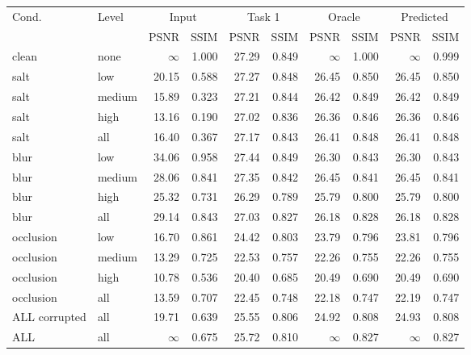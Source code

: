 \begin{tabular}{llrrrrrrrr}
\hline
Cond. & Level & \multicolumn{2}{c}{Input} & \multicolumn{2}{c}{Task 1} & \multicolumn{2}{c}{Oracle} & \multicolumn{2}{c}{Predicted} \\
 & & PSNR & SSIM & PSNR & SSIM & PSNR & SSIM & PSNR & SSIM \\
\hline
clean & none & $\infty$ & 1.000 & 27.29 & 0.849 & $\infty$ & 1.000 & $\infty$ & 0.999 \\
salt & low & 20.15 & 0.588 & 27.27 & 0.848 & 26.45 & 0.850 & 26.45 & 0.850 \\
salt & medium & 15.89 & 0.323 & 27.21 & 0.844 & 26.42 & 0.849 & 26.42 & 0.849 \\
salt & high & 13.16 & 0.190 & 27.02 & 0.836 & 26.36 & 0.846 & 26.36 & 0.846 \\
salt & all & 16.40 & 0.367 & 27.17 & 0.843 & 26.41 & 0.848 & 26.41 & 0.848 \\
blur & low & 34.06 & 0.958 & 27.44 & 0.849 & 26.30 & 0.843 & 26.30 & 0.843 \\
blur & medium & 28.06 & 0.841 & 27.35 & 0.842 & 26.45 & 0.841 & 26.45 & 0.841 \\
blur & high & 25.32 & 0.731 & 26.29 & 0.789 & 25.79 & 0.800 & 25.79 & 0.800 \\
blur & all & 29.14 & 0.843 & 27.03 & 0.827 & 26.18 & 0.828 & 26.18 & 0.828 \\
occlusion & low & 16.70 & 0.861 & 24.42 & 0.803 & 23.79 & 0.796 & 23.81 & 0.796 \\
occlusion & medium & 13.29 & 0.725 & 22.53 & 0.757 & 22.26 & 0.755 & 22.26 & 0.755 \\
occlusion & high & 10.78 & 0.536 & 20.40 & 0.685 & 20.49 & 0.690 & 20.49 & 0.690 \\
occlusion & all & 13.59 & 0.707 & 22.45 & 0.748 & 22.18 & 0.747 & 22.19 & 0.747 \\
ALL corrupted & all & 19.71 & 0.639 & 25.55 & 0.806 & 24.92 & 0.808 & 24.93 & 0.808 \\
ALL & all & $\infty$ & 0.675 & 25.72 & 0.810 & $\infty$ & 0.827 & $\infty$ & 0.827 \\
\hline
\end{tabular}
